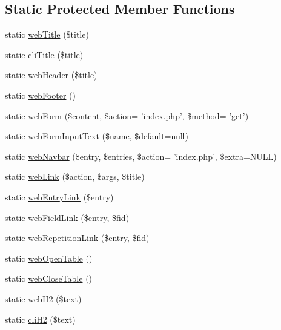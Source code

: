 \subsection*{Static Protected Member Functions}
\begin{DoxyCompactItemize}
\item 
static \hyperlink{classCinisisDisplayHelper_af3849efbba5e6980ddfdb4ceddb6ad17}{webTitle} (\$title)
\item 
static \hyperlink{classCinisisDisplayHelper_a8f0c8aec5b11a144b14278d287238c85}{cliTitle} (\$title)
\item 
static \hyperlink{classCinisisDisplayHelper_a356d8117dfcb220b7bb9996b569f5f25}{webHeader} (\$title)
\item 
static \hyperlink{classCinisisDisplayHelper_aa331cd95a86ffd270784736e74f253e6}{webFooter} ()
\item 
static \hyperlink{classCinisisDisplayHelper_a7ba5dd0ddd1ba9de5efdbfa1b62d4efa}{webForm} (\$content, \$action= 'index.php', \$method= 'get')
\item 
static \hyperlink{classCinisisDisplayHelper_a4c8934dc88cda9c7a894106b4dc7abba}{webFormInputText} (\$name, \$default=null)
\item 
static \hyperlink{classCinisisDisplayHelper_a291e2da97fd646e7fa34fb92879fc3d6}{webNavbar} (\$entry, \$entries, \$action= 'index.php', \$extra=NULL)
\item 
static \hyperlink{classCinisisDisplayHelper_aadc869909d8be43402d73fa3415827b4}{webLink} (\$action, \$args, \$title)
\item 
static \hyperlink{classCinisisDisplayHelper_a7ffe33c336d0b495807a2c4bae78cbfb}{webEntryLink} (\$entry)
\item 
static \hyperlink{classCinisisDisplayHelper_a5c3500893f3f7e415fe87874c808021d}{webFieldLink} (\$entry, \$fid)
\item 
static \hyperlink{classCinisisDisplayHelper_a1400c9d85878229fd02b3651ed9e0d63}{webRepetitionLink} (\$entry, \$fid)
\item 
static \hyperlink{classCinisisDisplayHelper_a4028def92d8511e525251ec7ab06246d}{webOpenTable} ()
\item 
static \hyperlink{classCinisisDisplayHelper_ab4e55ec58b59bc8b2af32b93cdf0d7c1}{webCloseTable} ()
\item 
static \hyperlink{classCinisisDisplayHelper_a0f2e5c78f6fdd146df04382e497cfe94}{webH2} (\$text)
\item 
static \hyperlink{classCinisisDisplayHelper_aa15ca1975a280814a1cdc2df82b8c67d}{cliH2} (\$text)

\end{DoxyCompactItemize}
